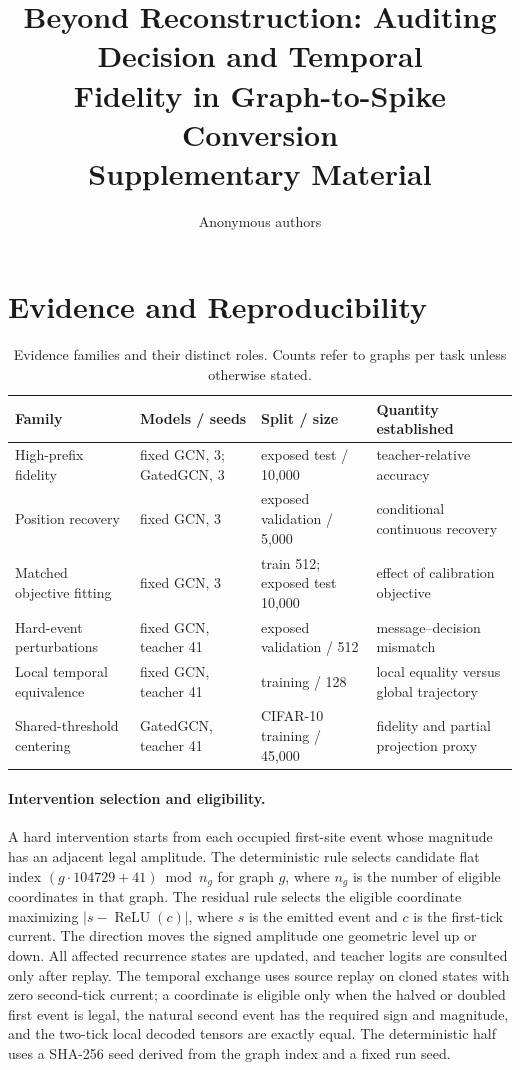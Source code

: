 \documentclass[10pt,twocolumn,letterpaper]{article}
\title{Beyond Reconstruction: Auditing Decision and Temporal\\Fidelity in Graph-to-Spike Conversion\\Supplementary Material}
\author{Anonymous authors}
\begin{document}
\maketitle
\section{Evidence and Reproducibility}


\begin{table}[t]\centering\small
\caption{Evidence families and their distinct roles. Counts refer to graphs per task unless otherwise stated.}
\label{tab:scope}
\setlength{\tabcolsep}{5pt}\begin{tabular}{llll}\toprule
Family & Models / seeds & Split / size & Quantity established\\\midrule
High-prefix fidelity & fixed GCN, 3; GatedGCN, 3 & exposed test / 10,000 & teacher-relative accuracy\\
Position recovery & fixed GCN, 3 & exposed validation / 5,000 & conditional continuous recovery\\
Matched objective fitting & fixed GCN, 3 & train 512; exposed test 10,000 & effect of calibration objective\\
Hard-event perturbations & fixed GCN, teacher 41 & exposed validation / 512 & message--decision mismatch\\
Local temporal equivalence & fixed GCN, teacher 41 & training / 128 & local equality versus global trajectory\\
Shared-threshold centering & GatedGCN, teacher 41 & CIFAR-10 training / 45,000 & fidelity and partial projection proxy\\

\end{tabular}\end{table}



\paragraph{Intervention selection and eligibility.} A hard intervention starts from each occupied first-site event whose magnitude has an adjacent legal amplitude. The deterministic rule selects candidate flat index $(g\cdot104729+41)\bmod n_g$ for graph $g$, where $n_g$ is the number of eligible coordinates in that graph. The residual rule selects the eligible coordinate maximizing $|s-\operatorname{ReLU}(c)|$, where $s$ is the emitted event and $c$ is the first-tick current. The direction moves the signed amplitude one geometric level up or down. All affected recurrence states are updated, and teacher logits are consulted only after replay. The temporal exchange uses source replay on cloned states with zero second-tick current; a coordinate is eligible only when the halved or doubled first event is legal, the natural second event has the required sign and magnitude, and the two-tick local decoded tensors are exactly equal. The deterministic half uses a SHA-256 seed derived from the graph index and a fixed run seed.
\end{document}

